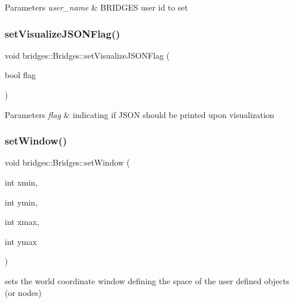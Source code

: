\begin{DoxyParams}{Parameters}
{\em user\+\_\+name} & B\+R\+I\+D\+G\+ES user id to set \\
\hline
\end{DoxyParams}
\mbox{\label{classbridges_1_1_bridges_a69aca37ab2729d0345e0549d7baf0423}} 
\subsubsection{\texorpdfstring{setVisualizeJSONFlag()}{setVisualizeJSONFlag()}}
{\footnotesize\ttfamily void bridges\+::\+Bridges\+::set\+Visualize\+J\+S\+O\+N\+Flag (\begin{DoxyParamCaption}\item[{bool}]{flag }\end{DoxyParamCaption})\hspace{0.3cm}{\ttfamily [inline]}}


\begin{DoxyParams}{Parameters}
{\em flag} & indicating if J\+S\+ON should be printed upon visualization \\
\hline
\end{DoxyParams}
\mbox{\label{classbridges_1_1_bridges_a4e4817085ea8147039a2be72792b6a6e}} 
\subsubsection{\texorpdfstring{setWindow()}{setWindow()}\hspace{0.1cm}{\footnotesize\ttfamily [1/2]}}
{\footnotesize\ttfamily void bridges\+::\+Bridges\+::set\+Window (\begin{DoxyParamCaption}\item[{int}]{xmin,  }\item[{int}]{ymin,  }\item[{int}]{xmax,  }\item[{int}]{ymax }\end{DoxyParamCaption})\hspace{0.3cm}{\ttfamily [inline]}}

sets the world coordinate window defining the space of the user defined objects (or nodes)


